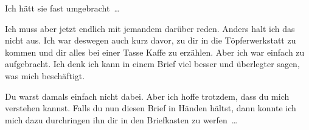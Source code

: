 Ich hätt sie fast umgebracht~\dots

Ich muss aber jetzt endlich mit jemandem darüber reden. Anders halt ich das nicht aus.
Ich war deswegen auch kurz davor, zu dir in die Töpferwerkstatt zu kommen und dir alles bei einer
Tasse Kaffe zu erzählen. Aber ich war einfach zu aufgebracht. Ich denk ich kann in einem Brief viel
besser und überlegter sagen, was mich beschäftigt.

Du warst damals einfach nicht dabei. Aber ich hoffe trotzdem, dass du mich verstehen kannst. Falls
du nun diesen Brief in Händen hältst, dann konnte ich mich dazu durchringen ihn dir in den
Briefkasten zu werfen~\dots
